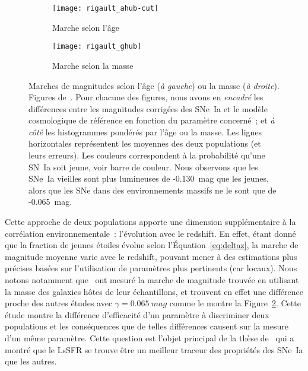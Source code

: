 \documentclass[../main/main.tex]{subfiles}
\begin{document}
\begin{figure}[ht]
    \centering
    \begin{subfigure}[c]{.48\linewidth}
        \centering
        \texttt{[image: rigault\_ahub-cut]}
        \caption[Marche de magnitude basée sur l'âge]{Marche selon l'âge}
    \label{fig:rigahub}
    \end{subfigure}
    \begin{subfigure}[c]{.48\linewidth}
        \centering
        \texttt{[image: rigault\_ghub]}
        \caption[Marche de magnitude basée sur la masse]{Marche selon la masse}
    \label{fig:rigghub}
    \end{subfigure}
    \caption[Marches de magnitudes selon l'âge et la masse]{Marches de
        magnitudes selon l'âge (\textit{à gauche}) ou la masse (\textit{à
        droite}). Figures de~\cite{rigault2020}. Pour chacune des figures, nous
        avons en \textit{encadré} les différences entre les magnitudes corrigées
        des SNe~Ia et le modèle cosmologique de référence en fonction du
        paramètre concerné~; et \textit{à côté} les histogrammes pondérés par
        l'âge ou la masse. Les lignes horizontales représentent les moyennes des
        deux populations (et leurs erreurs). Les couleurs correspondent à la
        probabilité qu'une SN~Ia soit jeune, voir barre de couleur. Nous
        observons que les SNe~Ia vieilles sont plus lumineuses de
        -\SI{0.130}{mag} que les jeunes, alors que les SNe dans des
    environnements massifs ne le sont que de -\SI{0.065}{mag}.}
    \label{fig:rig}
\end{figure}

Cette approche de deux populations apporte une dimension supplémentaire à la
corrélation environnementale~: l'évolution avec le redshift. En effet, étant
donné que la fraction de jeunes étoiles évolue selon l'Équation~\ref{eq:deltaz},
la marche de magnitude moyenne varie avec le redshift, pouvant mener à des
estimations plus précises basées sur l'utilisation de paramètres plus pertinents
(car locaux). Nous notons notamment que~\cite{rigault2020} ont mesuré la marche
de magnitude trouvée en utilisant la masse des galaxies hôtes de leur
échantillons, et trouvent en effet une différence proche des autres études avec
$\gamma = \SI{0.065}{mag}$ comme le montre la Figure~\ref{fig:rigghub}. Cette
étude montre la différence d'efficacité d'un paramètre à discriminer deux
populations et les conséquences que de telles différences causent sur la mesure
d'un même paramètre. Cette question est l'objet principal de la thèse
de~\cite{briday2021} qui a montré que le LsSFR se trouve être un meilleur
traceur des propriétés des SNe~Ia que les autres.
\end{document}
